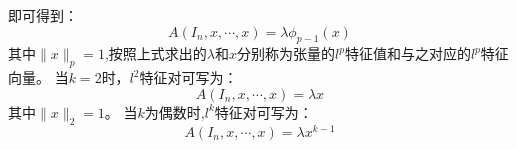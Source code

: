 \documentclass[UTF8]{ctexart}
\begin{document}
即可得到：\newline
$$A(I_n,x,\cdots,x) = \lambda\phi_{p-1}(x)$$
其中$\|x\|_p = 1$,按照上式求出的$\lambda$和$x$分别称为张量的$l^p$特征值和与之对应的$l^p$特征向量。\newline
当$k = 2$时，$l^2$特征对可写为：
$$A(I_n,x,\cdots,x) = \lambda x$$
其中$\|x\|_2 = 1$。\newline
当$k$为偶数时,$l^k$特征对可写为：\newline
$$A(I_n,x,\cdots,x) = \lambda x^{k - 1}$$


\end{document}
